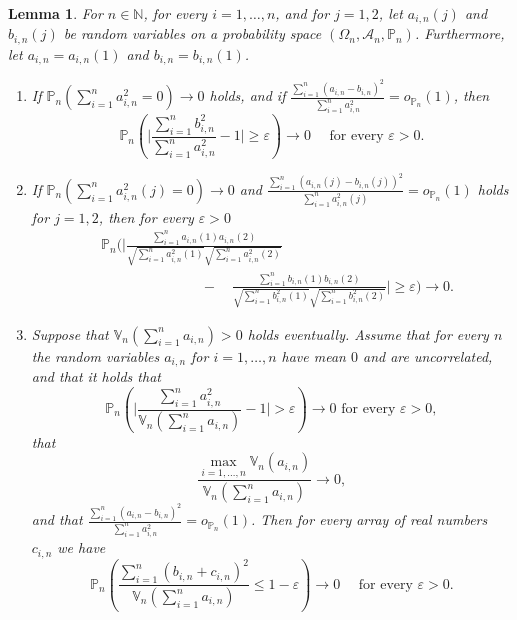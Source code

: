 \documentclass[preprint]{imsart}
\newcommand{\N}{{\mathbb N}}
\newcommand{\eps}{\varepsilon}
\newtheorem{lemma}[theorem]{Lemma}
\numberwithin{equation}{section}
\begin{document}
\begin{lemma}\label{lemma:auxi}
For $n \in \N$, for every $i = 1, \hdots, n$, and for $j = 1, 2$, let  $a_{i,n}(j)$ and $b_{i,n}(j)$ be random variables on a probability space $(\Omega_n, \mathcal{A}_n, \mathbb{P}_n)$. Furthermore, let $a_{i,n}=a_{i,n}(1)$ and $b_{i,n}=b_{i,n}(1)$.

\begin{enumerate}
\item If $\mathbb{P}_n(\sum_{i = 1}^n a^2_{i,n} = 0) \to 0$ holds, and if $\frac{\sum_{i = 1}^n (a_{i,n} - b_{i,n})^2}{\sum_{i = 1}^n a^2_{i,n} } = o_{\mathbb{P}_n}(1)$, then 
%
\begin{equation}
\mathbb{P}_n \left( \bigg| \frac{\sum_{i = 1}^n b^2_{i,n} }{\sum_{i = 1}^n  a^2_{i,n}} - 1 \bigg| \geq \eps \right) \to 0 \quad \text{ for every } \eps > 0.
\end{equation}
%
\item If $\mathbb{P}_n(\sum_{i = 1}^n a^2_{i,n}(j) = 0) \to 0$ and $\frac{\sum_{i = 1}^n (a_{i,n}(j) - b_{i,n}(j))^2}{\sum_{i = 1}^n a^2_{i,n}(j) } = o_{\mathbb{P}_n}(1)$ holds for $j = 1, 2$, then for every $\eps > 0$ 
%
\begin{align}
&\mathbb{P}_n \bigg( \bigg | \frac{\sum_{i = 1}^n a_{i,n}(1)  a_{i,n}(2)}{\sqrt{\sum_{i = 1}^n  a_{i,n}^2(1) } \sqrt{  \sum_{i = 1}^n  a^2_{i,n}(2)}} 
\\[7pt] & \hspace{3cm}  - \quad  \frac{\sum_{i = 1}^n b_{i,n}(1)  b_{i,n}(2)}{\sqrt{\sum_{i = 1}^n  b_{i,n}^2(1)}  \sqrt{\sum_{i = 1}^n  b^2_{i,n}(2)}} \bigg | \geq \eps \bigg) \to 0.
\end{align}
%
\item Suppose that $\mathbb{V}_n(\sum_{i = 1}^n a_{i,n}) > 0$ holds eventually. Assume that for every $n$ the random variables $a_{i,n}$ for $i = 1, \hdots, n$ have mean $0$ and are uncorrelated, and that it holds that  
%
\begin{equation}\label{eqn:consia}
\mathbb{P}_n\left(\bigg|\frac{\sum_{i = 1}^n a^2_{i,n}}{\mathbb{V}_n(\sum_{i = 1}^n a_{i,n})} - 1\bigg| > \eps\right) \to 0 \text{ for every } \eps > 0,
\end{equation}
%
that
%
\begin{equation}\label{eqn:maxto0}
\frac{\max_{i = 1, \hdots, n} \mathbb{V}_n(a_{i,n})}
{\mathbb{V}_n(\sum_{i = 1}^n a_{i,n})} \to 0,
\end{equation}
%
and that $\frac{\sum_{i = 1}^n (a_{i,n} - b_{i,n})^2}{\sum_{i = 1}^n a^2_{i,n} } = o_{\mathbb{P}_n}(1)$. Then for every array of real numbers $c_{i,n}$ we have
%
\begin{equation}
\mathbb{P}_n \left(  \frac{\sum_{i = 1}^n (b_{i,n} + c_{i,n})^2}{\mathbb{V}_n(\sum_{i = 1}^n a_{i,n})} \leq 1 - \eps \right) \to 0 \quad \text{ for every } \eps > 0.
\end{equation}
%
\end{enumerate}
\end{lemma}
\end{document}

